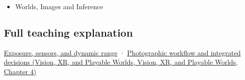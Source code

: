 \begin{itemize}
\tightlist
\item
  {Worlds, Images and Inference}
\end{itemize}

\subsection{Full teaching explanation}\label{appendix-92d45cdf2afc-full-teaching-explanation}

\hyperref[03-visual-computing-i-ch003-exposure-sensors-and-dynamic-range]{Exposure, sensors, and dynamic range} · \href{../07-Vision-XR-and-Playable-Worlds/main.pdf\#nameddest=04-visual-computing-ii-ch034-photographic-workflow-and-integrated-decisions}{Photographic workflow and integrated decisions (Vision, XR, and Playable Worlds, Vision, XR, and Playable Worlds, Chapter 4)}
